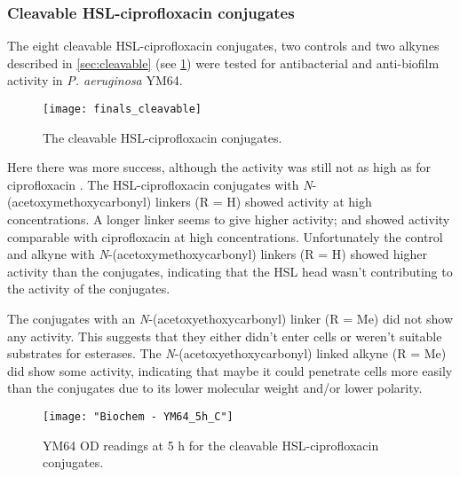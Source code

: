 \subsubsection{Cleavable HSL-ciprofloxacin conjugates\label{sec:bioC}}

The eight cleavable HSL-ciprofloxacin conjugates, two controls and two alkynes described in \ref{sec:cleavable} (see \ref{fgr:finals_cleavable}) were tested for antibacterial and anti-biofilm activity in \textit{P. aeruginosa} YM64. 

\begin{figure}[H]
	\begin{center}
		\texttt{[image: finals\_cleavable]}
		\caption{The cleavable HSL-ciprofloxacin conjugates.
 		\label{fgr:finals_cleavable}}
	\end{center}
\end{figure}

Here there was more success, although the activity was still not as high as for ciprofloxacin .
The HSL-ciprofloxacin conjugates with \textit{N}-(acetoxymethoxycarbonyl) linkers (R = H) showed activity at high concentrations. A longer linker seems to give higher activity;  and  showed activity comparable with ciprofloxacin  at high concentrations.
Unfortunately the control  and alkyne  with \textit{N}-(acetoxymethoxycarbonyl) linkers (R = H) showed higher activity than the conjugates, indicating that the HSL head wasn't contributing to the activity of the conjugates.

The conjugates with an \textit{N}-(acetoxyethoxycarbonyl) linker (R = Me) did not show any activity. This suggests that they either didn't enter cells or weren't suitable substrates for esterases.
The \textit{N}-(acetoxyethoxycarbonyl) linked alkyne (R = Me) did show some activity, indicating that maybe it could penetrate cells more easily than the conjugates due to its lower molecular weight and/or lower polarity.

\begin{figure}[H]
	\begin{center}
		\texttt{[image: "Biochem - YM64\_5h\_C"]}
		\caption{YM64 OD readings at 5 h for the cleavable HSL-ciprofloxacin conjugates.\label{fgr:YM64_5h_cleavable}}
	\end{center}
\end{figure}
